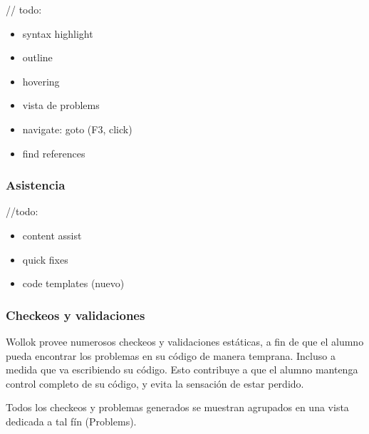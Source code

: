 // todo: 
\begin{itemize}
  \item syntax highlight
  \item outline
  \item hovering
  \item vista de problems 
  \item navigate: goto (F3, click)
  \item find references 
\end{itemize}

\subsubsection{Asistencia}

//todo: 
\begin{itemize}
  \item content assist
  \item quick fixes
  \item code templates (nuevo)
\end{itemize}

\subsubsection{Checkeos y validaciones}

Wollok provee numerosos checkeos y validaciones estáticas, a fin de que el
alumno pueda encontrar los problemas en su código de manera temprana.
Incluso a medida que va escribiendo su código.
Esto contribuye a que el alumno mantenga control completo de su
código, y evita la sensación de estar perdido.
 
Todos los checkeos y problemas
generados se muestran agrupados en una vista dedicada a tal fín (Problems).

